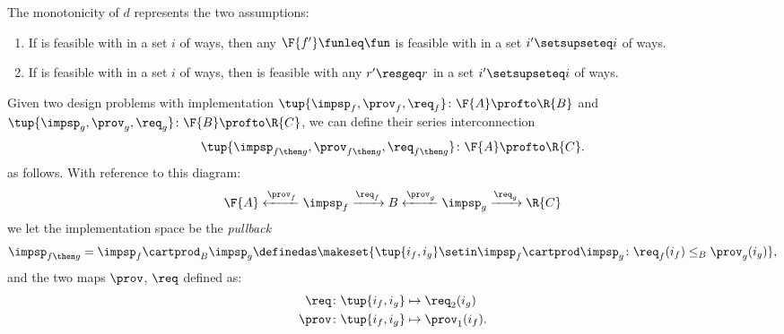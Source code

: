 {    \noindent The monotonicity of $d$ represents the two assumptions:
    \begin{enumerate}
        \item If \fun is feasible with \res in a set $i$ of ways, then any $\F{f'}\funleq \fun$ is feasible with \res in a set $i'\setsupseteq i$ of ways.
        \item If \fun is feasible with \res in a set $i$ of ways, then \fun is feasible with any $r'\resgeq r$ in a set $i'\setsupseteq i$ of ways.
    \end{enumerate}

    \begin{definition}
        \label{def:seriesdpi}
        Given two design problems with implementation $\tup{\impsp_f,\prov_f,\req_f}\colon \F{A}\profto \R{B}$ and $\tup{\impsp_g,\prov_g,\req_g}\colon \F{B}\profto \R{C}$, we can define their series interconnection
        \begin{equation}
            \tup{\impsp_{f\then g},\prov_{f\then g},\req_{f\then g}}\colon \F{A}\profto \R{C}.
        \end{equation}
        as follows.
        With reference to this diagram:
        \begin{equation}
            \F{A} \xleftarrow{\prov_f} \impsp_f \xrightarrow{\req_f} B
            \xleftarrow{\prov_g} \impsp_g \xrightarrow{\req_g} \R{C}
        \end{equation}
        we let the implementation space be the \emph{pullback}
        \begin{equation}
            \begin{aligned}
                \impsp_{f\then g} & = \impsp_f \cartprod_B \impsp_g \definedas \makeset{
                    \tup{i_f,i_g} \setin \impsp_f \cartprod \impsp_g \colon
                    \req_f(i_f) \leq_{B} \prov_g(i_g)
                }, \\
            \end{aligned}
        \end{equation}
        and the two maps $\prov$, $\req$ defined as:
        \begin{equation}
            \begin{aligned}
                \req  & \colon \tup{i_f,i_g} \mapsto \req_2(i_g) \\
                \prov & \colon  \tup{i_f,i_g} \mapsto \prov_1(i_f).
            \end{aligned}
        \end{equation}

\end{definition}}
